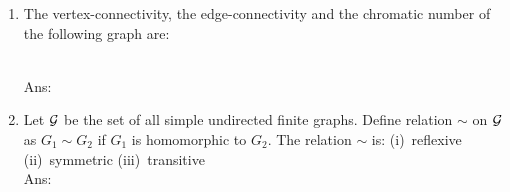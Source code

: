 \documentclass[10pt, letterpaper]{article}
\newcommand{\eat}[1]{}
\begin{document}
\begin{enumerate}


\item The vertex-connectivity, the edge-connectivity and the chromatic number of the following graph are:
\begin{figure*}[h]
\centering
\end{figure*}\\
Ans:



\item Let $\cal{G}$ be the set of all simple undirected finite graphs. Define relation $\sim$ on $\cal{G}$ as $G_1 \sim G_2$ if $G_1$ is homomorphic to $G_2$. The relation $\sim$ is: (i)~reflexive (ii)~symmetric (iii)~transitive\\
Ans:



\end{enumerate}
\end{document}
